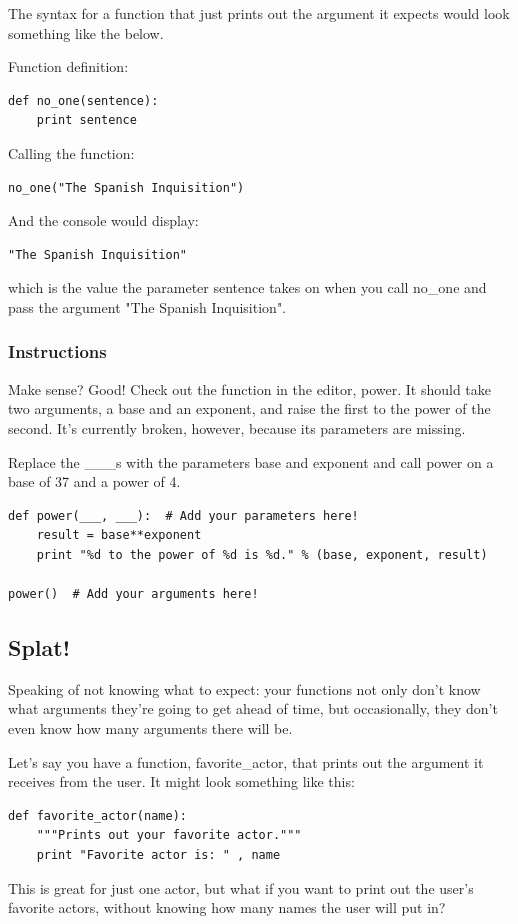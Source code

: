 \documentclass[12pt,a4paper,final,twoside,onecolumn,titlepage]{book}
\begin{document}
The syntax for a function that just prints out the argument it expects would look something like the below.

Function definition:
\begin{lstlisting}
def no_one(sentence):
    print sentence
\end{lstlisting}
Calling the function:
\begin{lstlisting}
no_one("The Spanish Inquisition")
\end{lstlisting}
And the console would display:
\begin{lstlisting}
"The Spanish Inquisition"
\end{lstlisting}
which is the value the parameter sentence takes on when you call no\_one and pass the argument "The Spanish Inquisition".
\subsubsection{Instructions}

Make sense? Good! Check out the function in the editor, power. It should take two arguments, a base and an exponent, and raise the first to the power of the second. It's currently broken, however, because its parameters are missing.

Replace the \_\_\_s with the parameters base and exponent and call power on a base of 37 and a power of 4.

\begin{lstlisting}
def power(___, ___):  # Add your parameters here!
    result = base**exponent
    print "%d to the power of %d is %d." % (base, exponent, result)

power()  # Add your arguments here!
\end{lstlisting}

\subsection{Splat!}

Speaking of not knowing what to expect: your functions not only don't know what arguments they're going to get ahead of time, but occasionally, they don't even know how many arguments there will be.

Let's say you have a function, favorite\_actor, that prints out the argument it receives from the user. It might look something like this:

\begin{lstlisting}
def favorite_actor(name):
    """Prints out your favorite actor."""
    print "Favorite actor is: " , name
\end{lstlisting}
This is great for just one actor, but what if you want to print out the user's favorite actors, without knowing how many names the user will put in?
\end{document}
